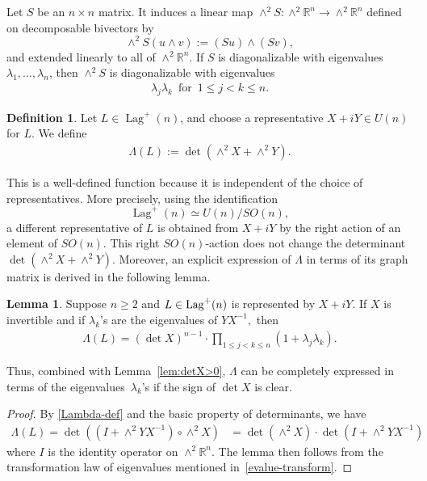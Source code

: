 \documentclass[11pt]{amsart}
\numberwithin{equation}{section}
\theoremstyle{definition}
\theoremstyle{definition}
\newtheorem{definition}[equation]{Definition}
\newtheorem{lemma}[equation]{Lemma}
\newcommand{\pr}[1]{\left(#1\right)}
\newcommand{\bb}[1]{\mathbb{#1}} \newcommand{\td}[1]{\widetilde{#1}}
\begin{document}
Let $S$ be an $n \times n$ matrix.
It induces a linear map
$\wedge^2 S : \wedge^2 \mathbb{R}^n
\to \wedge^2 \mathbb{R}^n$
defined on decomposable bivectors by
\[
\wedge^2 S(u \wedge v) := (Su) \wedge (Sv),
\]
and extended linearly to all of \(\wedge^2 \mathbb{R}^n\).
If \(S\) is diagonalizable with eigenvalues \(\lambda_1,\dots,\lambda_n\), then
\(\wedge^2 S\) is diagonalizable with eigenvalues
\begin{align}\label{evalue-transform}
\lambda_j\lambda_k
\,\text{ for }\,
1 \le j < k \le n .
\end{align}

\begin{definition}\label{Lambda}
	Let \(L \in \operatorname{Lag}^+(n)\), and choose a representative
	$X+iY\in U(n)$ for \(L\). 
	We define
	\begin{align}\label{Lambda-def}
	\Lambda(L)
	:= \det\pr{\wedge^2 X + \wedge^2 Y}.
	\end{align}
\end{definition}


This is a well-defined function because it is independent of the choice of representatives. 
More precisely, using the identification
\[
\operatorname{Lag}^+(n) \simeq {U}(n)/{SO}(n),
\]
a different representative of \(L\) is obtained from $X+iY$ by the right action of an element of ${SO}(n).$ 
This right ${SO}(n)$-action
does not change the determinant $\det\left(\wedge^2 X+\wedge^2 Y\right).$
Moreover, an explicit expression of $\Lambda$ in terms of its graph matrix is derived in the following lemma.

\begin{lemma}
	\label{lem:Lambda-in-terms-of-lambda}
	Suppose $n\ge 2$ and $L\in{\rm Lag}^+(n)$ is represented by $X+iY.$
	If $X$ is invertible and if $\lambda_k$'s are the eigenvalues of $YX^{-1},$ then
	\begin{align*}
	\Lambda(L)
	=\pr{\det X}^{n-1}
	\cdot \prod_{1\le j<k\le n} 
	\pr{1+\lambda_j\lambda_k}.
	\end{align*}
\end{lemma}


Thus, combined with Lemma~\ref{lem:detX>0}, $\Lambda$ can be completely expressed in terms of the eigenvalues~$\lambda_k$'s if the sign of $\det X$ is clear.


\begin{proof}
	By \eqref{Lambda-def} and the basic property of determinants, we have
	\begin{align*}
	\Lambda(L)
	= \det\pr{\pr{I + \wedge^2 YX^{-1}}\circ \wedge^2 X}
	& = \det\pr{\wedge^2X}
	\cdot \det\pr{I + \wedge^2 YX^{-1}}
	\end{align*}
	where $I$ is the identity operator on $\wedge^2\bb R^n.$
	The lemma then follows from the transformation law of eigenvalues mentioned in~\eqref{evalue-transform}.
\end{proof}
\end{document}
